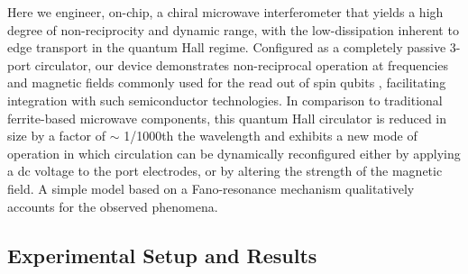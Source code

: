 Here we engineer, on-chip, a chiral microwave interferometer that yields a high degree of non-reciprocity and dynamic range, with the low-dissipation inherent to edge transport in the quantum Hall regime. Configured as a completely passive 3-port circulator, our device demonstrates non-reciprocal operation at frequencies and magnetic fields commonly used for the read out of spin qubits \cite{reilly2007fast,barthel2009rapid, colless2013dispersive, pla2012single}, facilitating integration with such semiconductor technologies. In comparison to traditional ferrite-based microwave components, this quantum Hall circulator is reduced in size by a factor of $\sim$ 1/1000th the wavelength and exhibits a new mode of operation in which circulation can be dynamically reconfigured either by applying a dc voltage to the port electrodes, or by altering the strength of the magnetic field. A simple model based on a Fano-resonance mechanism \cite{miroshnichenko2010fano} qualitatively accounts for the observed phenomena. 

\subsection{Experimental Setup and Results}
